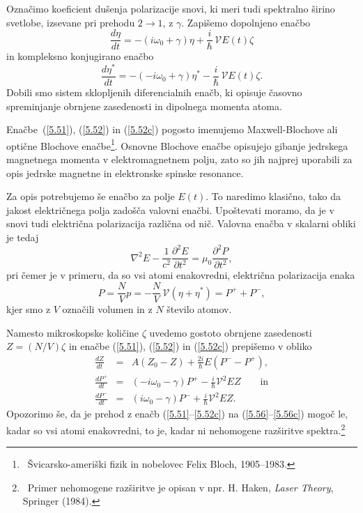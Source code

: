 Označimo
koeficient dušenja polarizacije snovi, ki meri tudi spektralno širino svetlobe, 
izsevane pri prehodu $2\rightarrow 1$, z $\gamma$. Zapišemo
dopolnjeno enačbo
\begin{equation}  
\label{5.52}
\frac{d\eta}{dt}=- \left(i \omega_0+\gamma\right)\eta+\frac{i}{\hslash}\,\mathcal{V} E(t) \zeta
\end{equation}
in kompleksno konjugirano enačbo
\begin{equation}  
\label{5.52c}
\frac{d\eta^*}{dt}=-\left(-i \omega_0+\gamma\right)\eta^*-\frac{i}{\hslash}\,\mathcal{V}E(t) \zeta.
\end{equation}
Dobili smo sistem sklopljenih diferencialnih enačb, ki opisuje časovno
spreminjanje obrnjene zasedenosti in dipolnega momenta atoma. 

\begin{remark}
 Enačbe~(\ref{5.51}), (\ref{5.52}) in (\ref{5.52c}) pogosto imenujemo 
 Maxwell-Blochove ali optične Blochove enačbe\footnote{~Švicarsko-ameriški fizik 
 in nobelovec Felix Bloch, 1905--1983.}. Osnovne Blochove enačbe opisujejo gibanje 
 jedrskega magnetnega  momenta v elektromagnetnem polju, zato so jih najprej uporabili za opis 
 jedrske magnetne in elektronske spinske resonance. 
\end{remark}

Za opis potrebujemo še enačbo za polje $E(t)$. To naredimo klasično, tako da
jakost električnega polja zadošča valovni enačbi. Upoštevati moramo, 
da je v snovi tudi električna polarizacija različna od nič. 
Valovna enačba v skalarni obliki je tedaj
\begin{equation}  
\label{5.54}
\nabla^2 E-\frac{1}{c^2}\frac{\partial^2 E}{\partial t^2}=\mu_0 \frac{\partial^2 P}{\partial t^2},
\end{equation}
pri čemer je v primeru, da so vsi atomi enakovredni, električna polarizacija enaka
\begin{equation}  
\label{5.53}
P=\frac{N}{V}p = -\frac{N}{V}\,\mathcal{V}\left(\eta+\eta^{\ast}\right)=P^+ + P^-,
\end{equation}
kjer smo z $V$ označili volumen in z $N$ število atomov.

Namesto mikroskopske količine $\zeta$ uvedemo gostoto obrnjene
zasedenosti $Z=(N/V)\zeta$ in enačbe (\ref{5.51}), (\ref{5.52}) in (\ref{5.52c})
prepišemo v obliko 
\begin{eqnarray}
\frac{dZ}{dt} &=& A\left(Z_0-Z\right)+\frac{2i}{\hslash}E\left(P^- - P^+\right), \label{5.56} \\
\frac{dP^+}{dt}&=&\left(-i \omega_0-\gamma\right)P^{+}-\frac{i}{\hslash} \mathcal{V}^2 E  Z \qquad 
\mathrm{in} \label{5.56b}\\
\frac{dP^-}{dt}&=&\left(i \omega_0-\gamma\right)P^{-}+\frac{i}{\hslash} \mathcal{V}^2 E  Z.\label{5.56c} 
\end{eqnarray}
Opozorimo še, da je prehod z enačb (\ref{5.51}--\ref{5.52c}) na (\ref{5.56}--\ref{5.56c}) 
mogoč le, kadar so vsi atomi enakovredni, to je, kadar ni nehomogene razširitve 
spektra.\footnote{~Primer nehomogene razširitve je opisan v npr.  
H. Haken, {\it Laser Theory}, Springer (1984).}
\newpage

